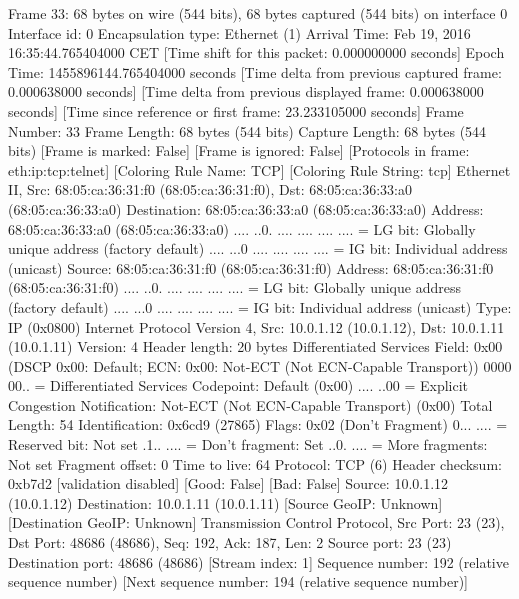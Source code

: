Frame 33: 68 bytes on wire (544 bits), 68 bytes captured (544 bits) on interface 0
    Interface id: 0
    Encapsulation type: Ethernet (1)
    Arrival Time: Feb 19, 2016 16:35:44.765404000 CET
    [Time shift for this packet: 0.000000000 seconds]
    Epoch Time: 1455896144.765404000 seconds
    [Time delta from previous captured frame: 0.000638000 seconds]
    [Time delta from previous displayed frame: 0.000638000 seconds]
    [Time since reference or first frame: 23.233105000 seconds]
    Frame Number: 33
    Frame Length: 68 bytes (544 bits)
    Capture Length: 68 bytes (544 bits)
    [Frame is marked: False]
    [Frame is ignored: False]
    [Protocols in frame: eth:ip:tcp:telnet]
    [Coloring Rule Name: TCP]
    [Coloring Rule String: tcp]
Ethernet II, Src: 68:05:ca:36:31:f0 (68:05:ca:36:31:f0), Dst: 68:05:ca:36:33:a0 (68:05:ca:36:33:a0)
    Destination: 68:05:ca:36:33:a0 (68:05:ca:36:33:a0)
        Address: 68:05:ca:36:33:a0 (68:05:ca:36:33:a0)
        .... ..0. .... .... .... .... = LG bit: Globally unique address (factory default)
        .... ...0 .... .... .... .... = IG bit: Individual address (unicast)
    Source: 68:05:ca:36:31:f0 (68:05:ca:36:31:f0)
        Address: 68:05:ca:36:31:f0 (68:05:ca:36:31:f0)
        .... ..0. .... .... .... .... = LG bit: Globally unique address (factory default)
        .... ...0 .... .... .... .... = IG bit: Individual address (unicast)
    Type: IP (0x0800)
Internet Protocol Version 4, Src: 10.0.1.12 (10.0.1.12), Dst: 10.0.1.11 (10.0.1.11)
    Version: 4
    Header length: 20 bytes
    Differentiated Services Field: 0x00 (DSCP 0x00: Default; ECN: 0x00: Not-ECT (Not ECN-Capable Transport))
        0000 00.. = Differentiated Services Codepoint: Default (0x00)
        .... ..00 = Explicit Congestion Notification: Not-ECT (Not ECN-Capable Transport) (0x00)
    Total Length: 54
    Identification: 0x6cd9 (27865)
    Flags: 0x02 (Don't Fragment)
        0... .... = Reserved bit: Not set
        .1.. .... = Don't fragment: Set
        ..0. .... = More fragments: Not set
    Fragment offset: 0
    Time to live: 64
    Protocol: TCP (6)
    Header checksum: 0xb7d2 [validation disabled]
        [Good: False]
        [Bad: False]
    Source: 10.0.1.12 (10.0.1.12)
    Destination: 10.0.1.11 (10.0.1.11)
    [Source GeoIP: Unknown]
    [Destination GeoIP: Unknown]
Transmission Control Protocol, Src Port: 23 (23), Dst Port: 48686 (48686), Seq: 192, Ack: 187, Len: 2
    Source port: 23 (23)
    Destination port: 48686 (48686)
    [Stream index: 1]
    Sequence number: 192    (relative sequence number)
    [Next sequence number: 194    (relative sequence number)]
